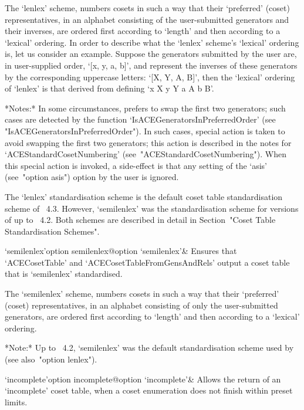 The  `lenlex'  scheme,  numbers  cosets  in  such  a  way  that  their
\lq{}preferred' (coset) representatives, in an alphabet consisting  of
the user-submitted generators and their inverses,  are  ordered  first
according to `length' and then according to a `lexical'  ordering.  In
order to describe what the `lenlex' scheme's  `lexical'  ordering  is,
let us consider an example. Suppose the generators  submitted  by  the
user are, in user-supplied order, `[x, y, a, b]',  and  represent  the
inverses of these generators by the corresponding  uppercase  letters:
`[X, Y, A, B]', then  the  `lexical'  ordering  of  `lenlex'  is  that
derived from defining `x \< X \< y \< Y \< a \< A \< b \< B'.

*Notes:*
In  some  circumstances,  {\ACE}  prefers  to  swap  the   first   two
generators;   such   cases    are    detected    by    the    function
`IsACEGeneratorsInPreferredOrder'                                 (see
"IsACEGeneratorsInPreferredOrder"). In such cases, special  action  is
taken to avoid {\ACE} swapping the first two generators;  this  action
is   described   in   the   notes   for    `ACEStandardCosetNumbering'
(see~"ACEStandardCosetNumbering").  When  this   special   action   is
invoked, a side-effect is that any setting of the `asis'  (see~"option
asis") option by the user is ignored.

The  `lenlex'  standardisation  scheme  is  the  default  coset  table
standardisation scheme of {\GAP}~4.3. However,  `semilenlex'  was  the
standardisation scheme for versions of {\GAP} up to  {\GAP}~4.2.  Both
schemes   are   described   in   detail   in   Section~"Coset    Table
Standardisation Schemes".

\>`semilenlex'{option semilenlex}@{option `semilenlex'}& 
Ensures that `ACECosetTable' and `ACECosetTableFromGensAndRels' output
a coset table that is `semilenlex' standardised.

The `semilenlex' scheme, numbers cosets  in  such  a  way  that  their
\lq{}preferred' (coset) representatives, in an alphabet consisting  of
only the user-submitted generators, are  ordered  first  according  to
`length' and then according to a `lexical' ordering.

*Note:*
Up to {\GAP}~4.2, `semilenlex' was the default standardisation  scheme
used by {\GAP} (see also~"option lenlex").

\>`incomplete'{option incomplete}@{option `incomplete'}& 
Allows the return  of  an  `incomplete'  coset  table,  when  a  coset
enumeration does not finish within preset limits.

